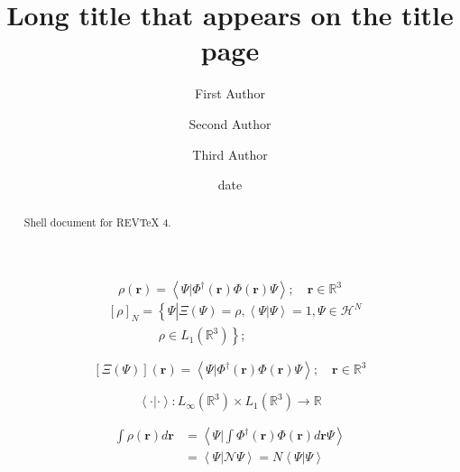 \documentclass[prl,twocolumn]{revtex4}%
\begin{document}
\title[Short title for running header]{Long title that appears on the title page}
\author{First Author}
\author{Second Author}
\author{Third Author}

\begin{abstract}
Shell document for REV\TeX{} 4.

\end{abstract}
\date[Date text]{date}




\maketitle
\tableofcontents


\section{}%

\[
\rho\left(  \mathbf{r}\right)  =\left\langle \left.  \Psi\right\vert
\Phi^{\dagger}\left(  \mathbf{r}\right)  \Phi\left(  \mathbf{r}\right)
\Psi\right\rangle ;\quad\mathbf{r\in}\mathbb{R}^{3}%
\]%
\begin{align*}
&  \left[  \rho\right]  _{N}=\left\{  \left.  \overset{}{\Psi}\right\vert
\Xi\left(  \Psi\right)  =\rho,\left\langle \left.  \Psi\right\vert
\Psi\right\rangle =1,\Psi\in\mathcal{H}^{N}\right. \\
&  \qquad\qquad\left.  \rho\in L_{1}\left(  \mathbb{R}^{3}\right)  \underset
{}{}\right\}  ;
\end{align*}
%

\[
\left[  \Xi\left(  \Psi\right)  \right]  \left(  \mathbf{r}\right)
=\left\langle \left.  \Psi\right\vert \Phi^{\dagger}\left(  \mathbf{r}\right)
\Phi\left(  \mathbf{r}\right)  \Psi\right\rangle ;\quad\mathbf{r\in}%
\mathbb{R}^{3}%
\]
%

\[
\left\langle \cdot|\cdot\right\rangle :L_{\infty}\left(  \mathbb{R}%
^{3}\right)  \times L_{1}\left(  \mathbb{R}^{3}\right)  \rightarrow\mathbb{R}%
\]
%

\begin{align*}
\int\rho\left(  \mathbf{r}\right)  d\mathbf{r}  &  =\left\langle \left.
\Psi\right\vert \int\Phi^{\dagger}\left(  \mathbf{r}\right)  \Phi\left(
\mathbf{r}\right)  d\mathbf{r}\Psi\right\rangle \\
&  =\left\langle \left.  \Psi\right\vert \mathcal{N}\Psi\right\rangle
=N\left\langle \left.  \Psi\right\vert \Psi\right\rangle
\end{align*}
%
\end{document}
